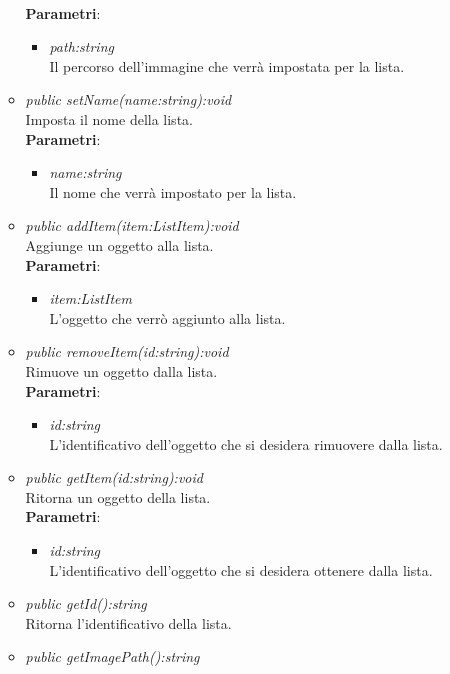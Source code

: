 \begin{itemize}
\begin{itemize}
				\\ \textbf{Parametri}: \begin{itemize}
				\item \textit{path:string}\\
				Il percorso dell'immagine che verrà impostata per la lista.
			\end{itemize} 
	\item \textit{public setName(name:string):void}\\
	Imposta il nome della lista.
				\\ \textbf{Parametri}: \begin{itemize}
				\item \textit{name:string}\\
				Il nome che verrà impostato per la lista.
			\end{itemize} 
	\item \textit{public addItem(item:ListItem):void}\\
	Aggiunge un oggetto alla lista.
				\\ \textbf{Parametri}: \begin{itemize}
				\item \textit{item:ListItem}\\
				L'oggetto che verrò aggiunto alla lista.
			\end{itemize} 
	\item \textit{public removeItem(id:string):void}\\
	Rimuove un oggetto dalla lista.
				\\ \textbf{Parametri}: \begin{itemize}
				\item \textit{id:string}\\
				L'identificativo dell'oggetto che si desidera rimuovere dalla lista.
			\end{itemize} 
	\item \textit{public getItem(id:string):void}\\
	Ritorna un oggetto della lista.
				\\ \textbf{Parametri}: \begin{itemize}
				\item \textit{id:string}\\
				L'identificativo dell'oggetto che si desidera ottenere dalla lista.
			\end{itemize} 
	\item \textit{public getId():string}\\
	Ritorna l'identificativo della lista.
	\item \textit{public getImagePath():string}\\

\end{itemize}
\end{itemize}
